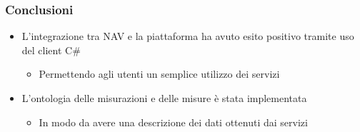 \documentclass{beamer}
\begin{document}




\begin{frame}
\frametitle{Conclusioni}
\begin{itemize}
\item L'integrazione tra NAV e la piattaforma ha avuto esito positivo tramite uso del client C\# 
\begin{itemize}
\item Permettendo agli utenti un semplice utilizzo dei servizi
\end{itemize}
\item L'ontologia delle misurazioni e delle misure è stata implementata
\begin{itemize}
\item In modo da avere una descrizione dei dati ottenuti dai servizi
\end{itemize}

\end{itemize}	
\end{frame}
\end{document}
